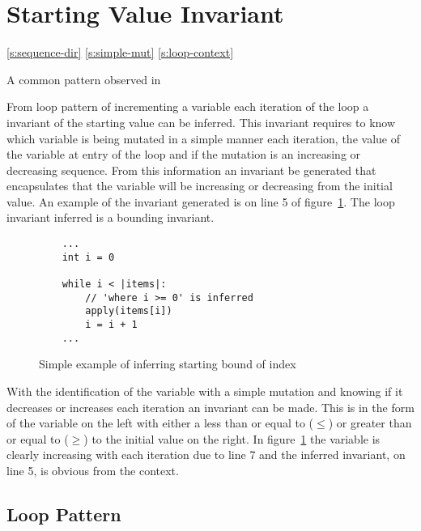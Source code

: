 \section{Starting Value Invariant}

\ref{s:sequence-dir} \ref{s:simple-mut} \ref{s:loop-context}

A common pattern observed in 

From loop pattern of incrementing a variable each iteration of the loop
a invariant of the starting value can be inferred.
This invariant requires to know which variable is being
mutated in a simple manner each iteration,
the value of the variable at entry of the loop and if the mutation is an
increasing or decreasing sequence.
From this information an invariant be generated that encapsulates that the
variable will be increasing or decreasing from the initial value.
An example of the invariant generated is on line 5 of
figure~\ref{lst:whiley-start}.
The loop invariant inferred is a bounding invariant.

\begin{figure}[ht]
\begin{lstlisting}
    ...
    int i = 0

    while i < |items|:
        // 'where i >= 0' is inferred
        apply(items[i])
        i = i + 1
    ...
\end{lstlisting}
\caption{Simple example of inferring starting bound of index}
\label{lst:whiley-start}
\end{figure}

With the identification of the variable with a simple mutation and knowing
if it decreases or increases each iteration an invariant can be made.
This is in the form of the variable on the left with either a less than or
equal to ($\leq$) or greater than or equal to ($\geq$) to the initial value on the
right.
In figure~\ref{lst:whiley-start} the variable  is clearly increasing
with each iteration due to line 7 and the inferred invariant, on line 5, is
obvious from the context.

\subsection{Loop Pattern}

